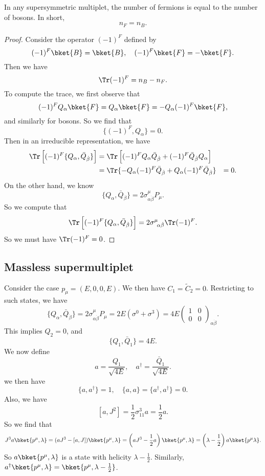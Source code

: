 \documentclass[a4paper]{article}
\begin{document}
\begin{prop}
  In any supersymmetric multiplet, the number of fermions is equal to the number of bosons. In short,
  \[
    n_F = n_B.
  \]
\end{prop}

\begin{proof}
  Consider the operator $(-1)^F$ defined by
  \[
    (-1)^F \bket{B} = \bket{B},\quad (-1)^F \bket{F} = -\bket{F}.
  \]
  Then we have
  \[
    \Tr (-1)^F = n_B - n_F.
  \]
  To compute the trace, we first observe that
  \[
    (-1)^F Q_\alpha \bket{F} = Q_\alpha \bket{F} = - Q_\alpha(-1)^F \bket{F},
  \]
  and similarly for bosons. So we find that
  \[
    \{(-1)^F, Q_\alpha\} = 0.
  \]
  Then in an irreducible representation, we have
  \begin{align*}
    \Tr \left[(-1)^F \{Q_\alpha, \bar{Q}_{\dot{\beta}}\}\right] &= \Tr \left[(-1)^F Q_\alpha \bar{Q}_{\dot{\beta}} + (-1)^F \bar{Q}_{\dot{\beta}} Q_\alpha\right]\\
    &= \Tr\{-Q_\alpha(-1)^F \bar{Q}_{\dot{\beta}} + Q_\alpha (-1)^F \bar{Q}_{\dot{\beta}}\}
    &= 0.
  \end{align*}
  On the other hand, we know
  \[
    \{Q_\alpha,\bar{Q}_{\dot{\beta}}\} = 2 \sigma^\mu_{\alpha \dot{\beta}} P_\mu.
  \]
  So we compute that
  \[
    \Tr \left[(-1)^F \{Q_\alpha, \bar{Q}_{\dot{\beta}}\}\right] = 2 \sigma^\mu\!_{\alpha\dot{\beta}} \Tr (-1)^F.
  \]
  So we must have $\Tr (-1)^F = 0$.
\end{proof}

\subsection{Massless supermultiplet}
Consider the case $p_\mu = (E, 0, 0, E)$. We then have $C_1 = \tilde{C}_2 = 0$. Restricting to such states, we have
\[
  \{Q_\alpha, \bar{Q}_{\dot{\beta}}\} = 2 \sigma^\mu_{\alpha \dot{\beta}} P_\mu = 2 E (\sigma^0 + \sigma^3) = 4E
  \begin{pmatrix}
    1 & 0\\
    0 & 0
  \end{pmatrix}_{\alpha \dot{\beta}}.
\]
This implies $Q_2 = 0$, and
\[
  \{Q_1, \bar{Q}_1\} = 4E.
\]
We now define
\[
  a = \frac{Q_1}{\sqrt{4E}},\quad a^\dagger = \frac{\bar{Q}_1}{\sqrt{4E}}.
\]
we then have
\[
  \{a, a^\dagger\} = 1,\quad \{a, a\} = \{a^\dagger, a^\dagger\} = 0.
\]
Also, we have
\[
  [a, J^2] = \frac{1}{2} \sigma_{11}^3 a = \frac{1}{2}a.
\]
So we find that
\[
  J^3a \bket{p^\mu, \lambda} = (aJ^3 - [a ,J])\bket{p^\mu, \lambda} = \left(aJ^3 - \frac{1}{2} a\right) \bket{p^\mu, \lambda} = \left(\lambda - \frac{1}{2}\right) a \bket{p^\mu \lambda}.
\]
So $a \bket{p^\mu, \lambda}$ is a state with helicity $\lambda - \frac{1}{2}$. Similarly, $a^\dagger \bket{p^\mu, \lambda} = \bket{p^\mu, \lambda - \frac{1}{2}}$. 
\end{document}
